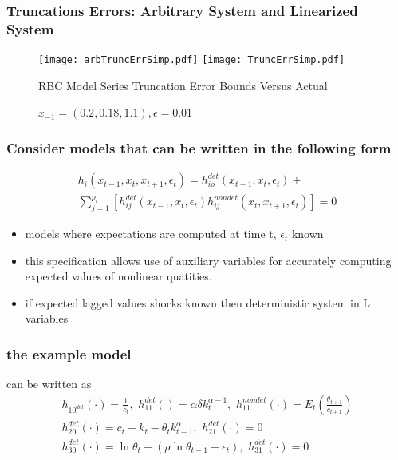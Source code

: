 \documentclass[tikz]{beamer}
\begin{document}
  \begin{frame}
    \frametitle{Truncations Errors: Arbitrary System and Linearized System}


\begin{figure}[H]
  \centering
\texttt{[image: arbTruncErrSimp.pdf]}  
\texttt{[image: TruncErrSimp.pdf]}  
\caption{RBC Model Series Truncation Error Bounds Versus Actual}
  \caption{ $x_{-1}=( {{0.2}, {0.18}, {1.1}}), \epsilon=0.01$} \label{arbFig}
\end{figure}


  \end{frame}





\begin{frame}
\frametitle{Consider  models that can be written in  the following form}


\begin{gather}
  h_i(x_{t-1},x_{t},x_{t+1},\epsilon_t)=h^{det}_{io}(x_{t-1},x_{t},\epsilon_t)+\\ \sum_{j=1}^{p_i} [h^{det}_{ij}(x_{t-1},x_{t},\epsilon_t)h^{nondet}_{ij}(x_{t},x_{t+1},\epsilon_t)]=0
\end{gather}

\begin{itemize}
\item models where expectations are computed at time t, $\epsilon_t$  known
\item this specification allows use of auxiliary variables for 
accurately computing expected values of nonlinear quatities.
\item if expected lagged values shocks known then deterministic system in L variables
\end{itemize}

\end{frame}


\begin{frame}
\frametitle{the example  model }
\label{sec:simple-rbc-model-ext} can be written as
\begin{gather}
h_{10^{det}}(\cdot)=\frac{1}{c_t},\,\,
h_{11}^{det}()=\alpha \delta k_{t}^{\alpha-1} ,\,\,
h_{11}^{nondet}(\cdot)=E_t \left (\frac{\theta_{t+1}}{c_{t+1}} \right )\\
h_{20}^{det}(\cdot)=c_t + k_t-\theta_tk_{t-1}^\alpha,\,\,
h_{21}^{det}(\cdot)=0\\
h_{30}^{det}(\cdot)=\ln \theta_t -(\rho \ln \theta_{t-1} + \epsilon_t),\,\,
h_{31}^{det}(\cdot)=0
\end{gather}

\end{frame}
\end{document}
